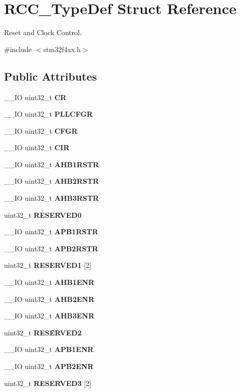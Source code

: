 \section{R\+C\+C\+\_\+\+Type\+Def Struct Reference}
\label{structRCC__TypeDef}


Reset and Clock Control.  




{\ttfamily \#include $<$stm32f4xx.\+h$>$}

\subsection*{Public Attributes}
\begin{DoxyCompactItemize}
\item 
\+\_\+\+\_\+\+IO uint32\+\_\+t \textbf{ CR}
\item 
\+\_\+\+\_\+\+IO uint32\+\_\+t \textbf{ P\+L\+L\+C\+F\+GR}
\item 
\+\_\+\+\_\+\+IO uint32\+\_\+t \textbf{ C\+F\+GR}
\item 
\+\_\+\+\_\+\+IO uint32\+\_\+t \textbf{ C\+IR}
\item 
\+\_\+\+\_\+\+IO uint32\+\_\+t \textbf{ A\+H\+B1\+R\+S\+TR}
\item 
\+\_\+\+\_\+\+IO uint32\+\_\+t \textbf{ A\+H\+B2\+R\+S\+TR}
\item 
\+\_\+\+\_\+\+IO uint32\+\_\+t \textbf{ A\+H\+B3\+R\+S\+TR}
\item 
uint32\+\_\+t \textbf{ R\+E\+S\+E\+R\+V\+E\+D0}
\item 
\+\_\+\+\_\+\+IO uint32\+\_\+t \textbf{ A\+P\+B1\+R\+S\+TR}
\item 
\+\_\+\+\_\+\+IO uint32\+\_\+t \textbf{ A\+P\+B2\+R\+S\+TR}
\item 
uint32\+\_\+t \textbf{ R\+E\+S\+E\+R\+V\+E\+D1} [2]
\item 
\+\_\+\+\_\+\+IO uint32\+\_\+t \textbf{ A\+H\+B1\+E\+NR}
\item 
\+\_\+\+\_\+\+IO uint32\+\_\+t \textbf{ A\+H\+B2\+E\+NR}
\item 
\+\_\+\+\_\+\+IO uint32\+\_\+t \textbf{ A\+H\+B3\+E\+NR}
\item 
uint32\+\_\+t \textbf{ R\+E\+S\+E\+R\+V\+E\+D2}
\item 
\+\_\+\+\_\+\+IO uint32\+\_\+t \textbf{ A\+P\+B1\+E\+NR}
\item 
\+\_\+\+\_\+\+IO uint32\+\_\+t \textbf{ A\+P\+B2\+E\+NR}
\item 
uint32\+\_\+t \textbf{ R\+E\+S\+E\+R\+V\+E\+D3} [2]

\end{DoxyCompactItemize}
